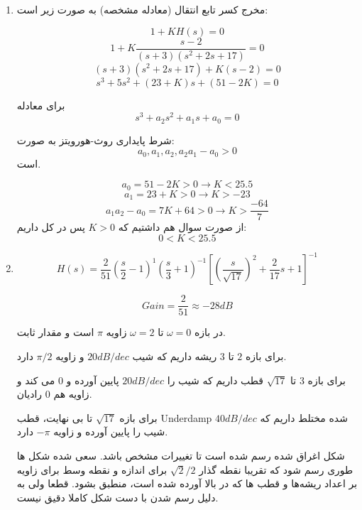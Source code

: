 \documentclass[12pt]{article}
\begin{document}
\begin{enumerate}
	\item
	
	مخرج کسر   تابع انتقال (معادله مشخصه) به صورت زیر است:
	
	$$1 + K H(s) = 0$$
	$$1 + K \frac{s-2}{(s+3)\left(s^{2}+2 s+17\right)} = 0$$
	$$(s+3)\left(s^{2}+2 s+17\right) + K(s-2) = 0$$
	$$
	s^{3}+5 s^{2}+(23+K) s+(51-2 K)=0
	$$
	
	برای معادله
	$$s^3 + a_2 s^2 + a_1 s + a_0 =0$$
	
	شرط پایداری روث-هورویتز به صورت:
	$$a_0 , a_1 , a_2 , a_2 a_1 - a_0 > 0$$
	است.
	
	$$a_0 = 51-2K > 0 \rightarrow K<25.5$$
	$$a_1 = 23 + K > 0 \rightarrow K>-23$$
	$$a_1 a_2 - a_0 = 7K + 64 >0 \rightarrow K>\frac{-64}{7}$$
	از صورت سوال هم داشتیم که $K>0$ پس در کل داریم:
	$$0<K<25.5$$ 
	
	
	\item
	$$H(s) = 
	\frac{2}{51}\left(\frac{s}{2}-1\right)^{1}\left(\frac{s}{3}+1\right)^{-1}\left[\left(\frac{s}{\sqrt{17}}\right)^{2}+\frac{2}{17} s+1\right]^{-1}
	$$
	
	$$Gain = \frac{2}{51} \approx -28 dB$$
	
	
	در بازه $\omega =0$ تا $\omega = 2$ زاویه $\pi$ است و مقدار ثابت.
	
	برای بازه $2$ تا $3$ ریشه داریم که شیب $20dB/dec$ و زاویه $\pi/2$ دارد.
	
	برای بازه $3$ تا $\sqrt{17}$ قطب داریم که شیب را $20dB/dec$ پایین آورده و $0$ می کند و زاویه هم $0$ رادیان.
	
	برای بازه $\sqrt{17}$ تا بی نهایت، قطب Underdamp شده مختلط داریم که $40dB/dec$ شیب را پایین آورده و زاویه $-\pi$ دارد.
	
	شکل اغراق شده رسم شده است تا تغییرات مشخص باشد. سعی شده شکل ها طوری رسم شود که تقریبا نقطه گذار $\sqrt{2}/2$ برای اندازه و نقطه وسط برای زاویه بر اعداد ریشه‌ها و قطب ها که در بالا آورده شده است، منطبق بشود. قطعا ولی به دلیل رسم شدن با دست شکل کاملا دقیق نیست.
	

\end{enumerate}
\end{document}
